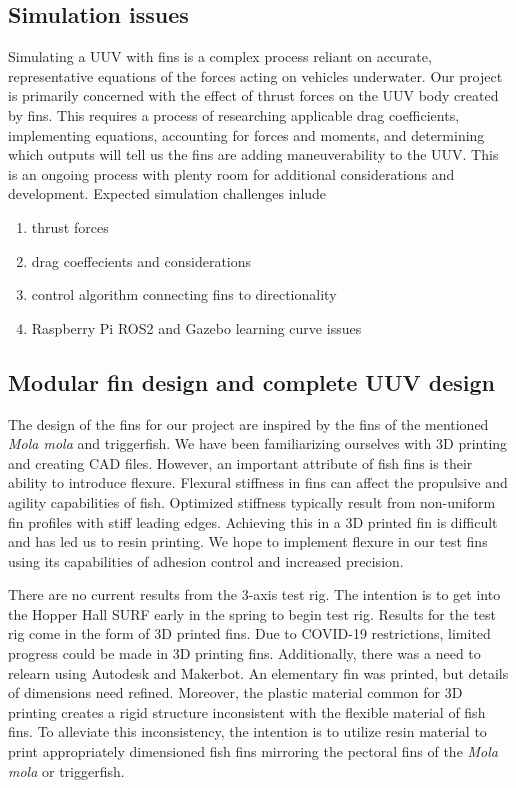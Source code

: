\documentclass[twocolumn,10pt]{IEEEtran}
\begin{document}
\subsection{Simulation issues}
Simulating a UUV with fins is a complex process reliant on accurate, representative equations of the forces acting on vehicles underwater. Our project is primarily concerned with the effect of thrust forces on the UUV body created by fins. This requires a process of researching applicable drag coefficients, implementing equations, accounting for forces and moments, and determining which outputs will tell us the fins are adding maneuverability to the UUV. This is an ongoing process with plenty room for additional considerations and development. Expected simulation challenges inlude
\begin{enumerate}
\item thrust forces
\item drag coeffecients and considerations
\item control algorithm connecting fins to directionality
\item Raspberry Pi ROS2 and Gazebo learning curve issues
\end{enumerate}



\subsection{Modular fin design and complete UUV design}
The design of the fins for our project are inspired by the fins of the mentioned \emph{Mola mola} and triggerfish. We have been familiarizing ourselves with 3D printing and creating CAD files. However, an important attribute of fish fins is their ability to introduce flexure. Flexural stiffness in fins can affect the propulsive and agility capabilities of fish. Optimized stiffness typically result from non-uniform fin profiles with stiff leading edges. Achieving this in a 3D printed fin is difficult and has led us to resin printing. We hope to implement flexure in our test fins using its capabilities of adhesion control and increased precision. 

There are no current results from the 3-axis test rig.  The intention is to get into the Hopper Hall SURF early in the spring to begin test rig.  Results for the test rig come in the form of 3D printed fins.  Due to COVID-19 restrictions, limited progress could be made in 3D printing fins.  Additionally, there was a need to relearn using Autodesk and Makerbot.  An elementary fin was printed, but details of dimensions need refined.  Moreover, the plastic material common for 3D printing creates a rigid structure inconsistent with the flexible material of fish fins.  To alleviate this inconsistency, the intention is to utilize resin material to print appropriately dimensioned fish fins mirroring the pectoral fins of the \emph{Mola mola} or triggerfish.
\end{document}
